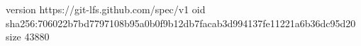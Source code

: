 version https://git-lfs.github.com/spec/v1
oid sha256:706022b7bd7797108b95a0b0f9b12db7facab3d994137fe11221a6b36dc95d20
size 43880
